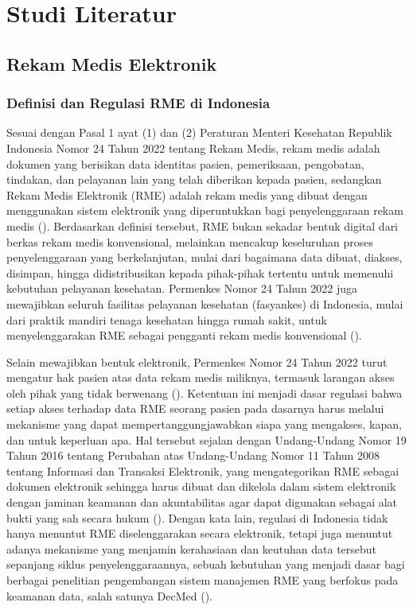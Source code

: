 \chapter{Studi Literatur}
\label{ch:studi-literatur}

\section{Rekam Medis Elektronik}
\label{sec:rme}

\subsection{Definisi dan Regulasi RME di Indonesia}
\label{subsec:definisi-regulasi-rme}

Sesuai dengan Pasal 1 ayat (1) dan (2) Peraturan Menteri Kesehatan Republik Indonesia Nomor 24 Tahun 2022 tentang Rekam Medis, rekam medis adalah dokumen yang berisikan data identitas pasien, pemeriksaan, pengobatan, tindakan, dan pelayanan lain yang telah diberikan kepada pasien, sedangkan Rekam Medis Elektronik (RME) adalah rekam medis yang dibuat dengan menggunakan sistem elektronik yang diperuntukkan bagi penyelenggaraan rekam medis (\cite{permenkes24_2022}). Berdasarkan definisi tersebut, RME bukan sekadar bentuk digital dari berkas rekam medis konvensional, melainkan mencakup keseluruhan proses penyelenggaraan yang berkelanjutan, mulai dari bagaimana data dibuat, diakses, disimpan, hingga didistribusikan kepada pihak-pihak tertentu untuk memenuhi kebutuhan pelayanan kesehatan. Permenkes Nomor 24 Tahun 2022 juga mewajibkan seluruh fasilitas pelayanan kesehatan (fasyankes) di Indonesia, mulai dari praktik mandiri tenaga kesehatan hingga rumah sakit, untuk menyelenggarakan RME sebagai pengganti rekam medis konvensional (\cite{permenkes24_2022}).

Selain mewajibkan bentuk elektronik, Permenkes Nomor 24 Tahun 2022 turut mengatur hak pasien atas data rekam medis miliknya, termasuk larangan akses oleh pihak yang tidak berwenang (\cite{permenkes24_2022}). Ketentuan ini menjadi dasar regulasi bahwa setiap akses terhadap data RME seorang pasien pada dasarnya harus melalui mekanisme yang dapat mempertanggungjawabkan siapa yang mengakses, kapan, dan untuk keperluan apa. Hal tersebut sejalan dengan Undang-Undang Nomor 19 Tahun 2016 tentang Perubahan atas Undang-Undang Nomor 11 Tahun 2008 tentang Informasi dan Transaksi Elektronik, yang mengategorikan RME sebagai dokumen elektronik sehingga harus dibuat dan dikelola dalam sistem elektronik dengan jaminan keamanan dan akuntabilitas agar dapat digunakan sebagai alat bukti yang sah secara hukum (\cite{uu19_2016}). Dengan kata lain, regulasi di Indonesia tidak hanya menuntut RME diselenggarakan secara elektronik, tetapi juga menuntut adanya mekanisme yang menjamin kerahasiaan dan keutuhan data tersebut sepanjang siklus penyelenggaraannya, sebuah kebutuhan yang menjadi dasar bagi berbagai penelitian pengembangan sistem manajemen RME yang berfokus pada keamanan data, salah satunya DecMed (\cite{DecMed}).


